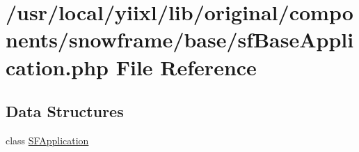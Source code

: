 \hypertarget{sfBaseApplication_8php}{
\section{/usr/local/yiixl/lib/original/components/snowframe/base/sfBaseApplication.php File Reference}
\label{sfBaseApplication_8php}
}
\subsection*{Data Structures}
\begin{DoxyCompactItemize}
\item 
class \hyperlink{classSFApplication}{SFApplication}
\end{DoxyCompactItemize}
